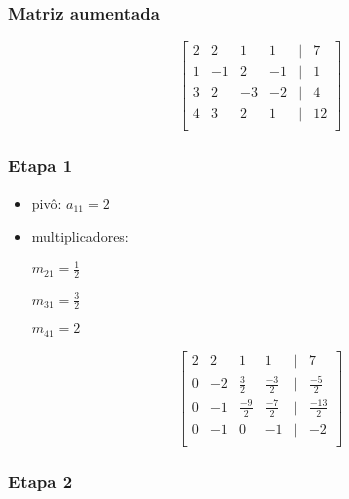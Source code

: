 \documentclass[a4paper]{article}
\begin{document}
\subsubsection{Matriz aumentada}

\begin{displaymath}
  \begin{bmatrix}
    2 & 2 & 1 & 1 & | & 7\\
    1 & -1 & 2 & -1 & | & 1\\
    3 & 2 & -3 & -2 & | & 4\\
    4 & 3 & 2 & 1 & | & 12\\
  \end{bmatrix}
\end{displaymath}

\subsubsection{Etapa 1}

\begin{itemize}
\item pivô: $a_{11} = 2$

\item multiplicadores:

$m_{21} = \frac{1}{2}$

$m_{31} = \frac{3}{2}$

$m_{41} = 2$

\end{itemize}
\begin{displaymath}
  \begin{bmatrix}
    2 & 2 & 1 & 1 & | & 7\\
    0 & -2 & \frac{3}{2} & \frac{-3}{2} & | & \frac{-5}{2}\\
    0 & -1 & \frac{-9}{2} & \frac{-7}{2} & | & \frac{-13}{2}\\
    0 & -1 & 0 & -1 & | & -2\\
  \end{bmatrix}
\end{displaymath}

\subsubsection{Etapa 2}
\end{document}
